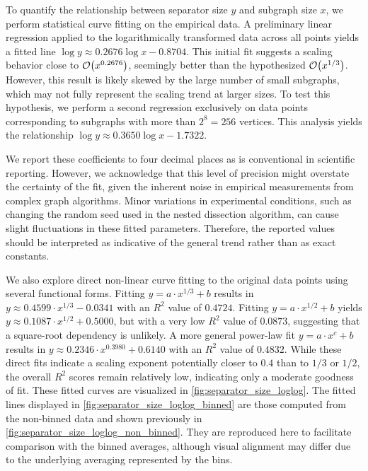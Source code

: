 To quantify the relationship between separator size \( y \) and subgraph size \( x \), we perform statistical curve fitting on the empirical data.
A preliminary linear regression applied to the logarithmically transformed data across all points yields a fitted line \( \log y \approx 0.2676 \log x - 0.8704 \).
This initial fit suggests a scaling behavior close to \( \mathcal{O}\!\left(x^{0.2676}\right) \), seemingly better than the hypothesized \( \mathcal{O}\!\left(x^{1/3}\right) \).
However, this result is likely skewed by the large number of small subgraphs, which may not fully represent the scaling trend at larger sizes.
To test this hypothesis, we perform a second regression exclusively on data points corresponding to subgraphs with more than \( 2^8 = 256 \) vertices.
This analysis yields the relationship \( \log y \approx 0.3650 \log x - 1.7322 \).

We report these coefficients to four decimal places as is conventional in scientific reporting.
However, we acknowledge that this level of precision might overstate the certainty of the fit, given the inherent noise in empirical measurements from complex graph algorithms.
Minor variations in experimental conditions, such as changing the random seed used in the nested dissection algorithm, can cause slight fluctuations in these fitted parameters.
Therefore, the reported values should be interpreted as indicative of the general trend rather than as exact constants.

We also explore direct non-linear curve fitting to the original data points using several functional forms.
Fitting \( y = a \cdot x^{1/3} + b \) results in \( y \approx 0.4599 \cdot x^{1/3} - 0.0341 \) with an \( R^2 \) value of \( 0.4724 \).
Fitting \( y = a \cdot x^{1/2} + b \) yields \( y \approx 0.1087 \cdot x^{1/2} + 0.5000 \), but with a very low \( R^2 \) value of \( 0.0873 \), suggesting that a square-root dependency is unlikely.
A more general power-law fit \( y = a \cdot x^c + b \) results in \( y \approx 0.2346 \cdot x^{0.3980} + 0.6140 \) with an \( R^2 \) value of \( 0.4832 \).
While these direct fits indicate a scaling exponent potentially closer to \( 0.4 \) than to \( 1/3 \) or \( 1/2 \), the overall \( R^2 \) scores remain relatively low, indicating only a moderate goodness of fit.
These fitted curves are visualized in \cref{fig:separator_size_loglog}.
The fitted lines displayed in \cref{fig:separator_size_loglog_binned} are those computed from the non-binned data and shown previously in \cref{fig:separator_size_loglog_non_binned}.
They are reproduced here to facilitate comparison with the binned averages, although visual alignment may differ due to the underlying averaging represented by the bins.

